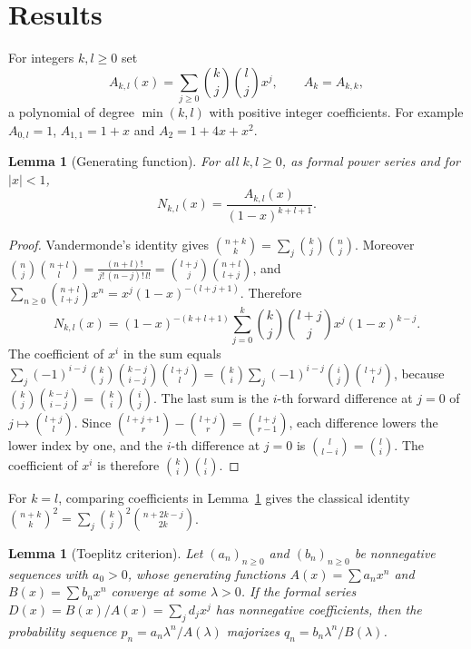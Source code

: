 \documentclass[11pt,a4paper]{article}
\newtheorem{lemma}[theorem]{Lemma}
\theoremstyle{definition}
\theoremstyle{plain}
\begin{document}
\section{Results}\label{sec:results}
For integers $k,l\ge0$ set
\[
A_{k,l}(x)=\sum_{j\ge0}\binom kj\binom lj x^j,\qquad A_k=A_{k,k},
\]
a polynomial of degree $\min(k,l)$ with positive integer coefficients. For
example $A_{0,l}=1$, $A_{1,1}=1+x$ and $A_2=1+4x+x^2$.

\begin{lemma}[Generating function]\label{lem:gf}
For all $k,l\ge0$, as formal power series and for $\lvert x\rvert<1$,
\[
N_{k,l}(x)=\frac{A_{k,l}(x)}{(1-x)^{k+l+1}} .
\]
\end{lemma}

\begin{proof}
Vandermonde's identity gives $\binom{n+k}{k}=\sum_j\binom kj\binom nj$. Moreover
$\binom nj\binom{n+l}{l}=\frac{(n+l)!}{j!\,(n-j)!\,l!}=\binom{l+j}{j}\binom{n+l}{l+j}$,
and $\sum_{n\ge0}\binom{n+l}{l+j}x^n=x^j(1-x)^{-(l+j+1)}$. Therefore
\[
N_{k,l}(x)=(1-x)^{-(k+l+1)}\sum_{j=0}^{k}\binom kj\binom{l+j}{j}x^j(1-x)^{k-j}.
\]
The coefficient of $x^i$ in the sum equals
$\sum_j(-1)^{i-j}\binom kj\binom{k-j}{i-j}\binom{l+j}{l}
=\binom ki\sum_j(-1)^{i-j}\binom ij\binom{l+j}{l}$, because
$\binom kj\binom{k-j}{i-j}=\binom ki\binom ij$. The last sum is the $i$-th
forward difference at $j=0$ of $j\mapsto\binom{l+j}{l}$. Since
$\binom{l+j+1}{r}-\binom{l+j}{r}=\binom{l+j}{r-1}$, each difference lowers the
lower index by one, and the $i$-th difference at $j=0$ is
$\binom{l}{l-i}=\binom li$. The coefficient of $x^i$ is therefore
$\binom ki\binom li$.
\end{proof}

For $k=l$, comparing coefficients in Lemma~\ref{lem:gf} gives the classical
identity $\binom{n+k}{k}^2=\sum_j\binom kj^2\binom{n+2k-j}{2k}$.

\begin{lemma}[Toeplitz criterion]\label{lem:toeplitz}
Let $(a_n)_{n\ge0}$ and $(b_n)_{n\ge0}$ be nonnegative sequences with $a_0>0$,
whose generating functions $A(x)=\sum a_nx^n$ and $B(x)=\sum b_nx^n$ converge at
some $\lambda>0$. If the formal series $D(x)=B(x)/A(x)=\sum_jd_jx^j$ has
nonnegative coefficients, then the probability sequence
$p_n=a_n\lambda^n/A(\lambda)$ majorizes $q_n=b_n\lambda^n/B(\lambda)$.
\end{lemma}
\end{document}
